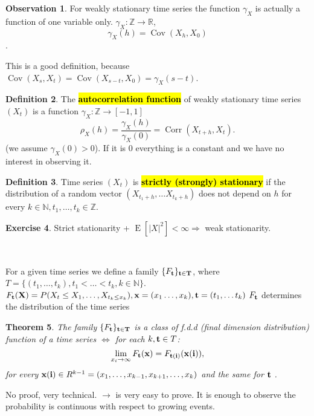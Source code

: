 \documentclass[12pt,a4paper, notitlepage]{book}
\newcommand{\hlc}[2][yellow]{ {\sethlcolor{#1} \hl{#2}} }
\newcommand{\hlcr}[1]{\hlc[lightred]{#1}}
\theoremstyle{definition} %
\newtheorem{definition}{Definition}[section]
\newtheorem{exercise}[definition]{Exercise}
\newtheorem{observation}[definition]{Observation}
\theoremstyle{plain} %
\newtheorem{theorem}[definition]{Theorem}
\newcommand{\R}{\mathbb R}
\newcommand{\N}{\mathbb N}
\newcommand{\Z}{\mathbb Z}
\DeclareMathOperator{\Cov}{Cov}
\DeclareMathOperator{\E}{E}
\DeclareMathOperator{\Corr}{Corr}
\newcommand{\New}[1]{ {\bf \hlcr{#1} } }
\begin{document}
\begin{observation}
For weakly stationary time series the function $\gamma_X$ is actually a function of one variable only. 
$\gamma_X : \Z \rightarrow \R$,
\[ \gamma_X(h) = \Cov(X_h, X_0)\].

This is a good definition, because $ \Cov(X_s, X_t) = \Cov(X_{s-t},X_0) = \gamma_X(s-t)$. 
\end{observation}


\begin{definition}
The \New{autocorrelation function} of weakly stationary time series $(X_t)$ is a function
$\gamma_X : \Z \rightarrow [-1, 1]$
\[ \rho_X(h) = \frac{\gamma_X(h)}{\gamma_X(0)} = \Corr(X_{t+h},X_t) . \]
(we assume $\gamma_X(0) > 0$). If it is $0$ everything is a constant and we have no interest in observing it.
\end{definition}

\begin{definition}
Time series $(X_t)$ is \New{strictly (strongly) stationary} if the distribution of a random vector $(X_{t_1 + h}, \dots X_{t_k + h})$ does not depend on $h$ for every $k\in \N, t_1, \dots, t_k \in \Z $.
\end{definition}

\begin{exercise}
Strict stationarity + $ \E [|X|^2] < \infty \Rightarrow$ weak stationarity.
\end{exercise}
\


For a given time series we define a family 
$\{  F_{\bf t} \}_{\bf t \in T}$, where $T = \{(t_1, \dots, t_k), t_1 < \dots < t_k, k \in \N\}$.
$F_{\bf t}({\bf X}) = P(X_t \leq X_1, \dots, X_{t_k \leq x_k}), {\bf x} = (x_1 \dots, x_k), {\bf t} = (t_1, \dots t_k)$
$F_{ \bf t}$ determines the distribution of the time series


\begin{theorem} 
The family $\{F_{\bf t}\}_{\bf t \in T}$ is a class of f.d.d (final dimension distribution) function of a time series
$\iff $
for each $k, {\bf t } \in T$:
\[ \lim_{x_i \rightarrow \infty} F_{\bf t}({\bf x}) = F_{\bf t(i)}  ({\bf x(i)}) , \] 
for every ${\bf x(i)} \in R^{k-1} = (x_1,\dots,x_{k-1},x_{k+1},\dots, x_k)$ and the same for ${\bf t}$ .
\label{th:1}
\end{theorem}
\proof
No proof, very technical. 
$\rightarrow$ is very easy to prove. It is enough to observe the probability is continuous with respect to growing events.
\endproof
\end{document}
